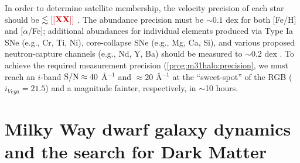 \documentclass[11pt,a4paper,twoside,onecolumn,openany,final,oldfontcommands]{memoir}
\def\NS#1{\noindent{\textcolor{lblue}{\textbf[NS: #1]}}}
\begin{document}
\begin{sciencerequirement}
\reqitem In order to determine satellite membership, the velocity precision of each star should be $\lesssim \edit{XX}$ \kms. 
\reqitem The abundance precision must be $\sim 0.1$ dex for both [Fe/H] and [$\alpha$/Fe]; additional abundances for individual elements produced via Type Ia SNe (e.g., Cr, Ti, Ni), core-collapse SNe (e.g., Mg, Ca, Si), and various proposed neutron-capture channels (e.g., Nd, Y, Ba) should be measured to $\sim$0.2 dex \citep[Fig.~\ref{fig:abundances_snr}; cf.][]{Sandford20}. \NS{This is copied from M31 disk requirements, need to temper for lower metallicity stars}  \label{prog:m31halo:precision}
\reqitem To achieve the required measurement precision (\ref{prog:m31halo:precision}, we must reach an $i$-band ${\rm S/N} \approx 40$ \AA$^{-1}$ and $\approx 20$ \AA$^{-1}$ at the  ``sweet-spot'' of the RGB ($i_{Vega} = 21.5$) and a magnitude fainter, respectively, in $\sim$10 hours. \NS{Spectral Resolution and wavelength requirements?}
\end{sciencerequirement}

\section{Milky Way dwarf galaxy dynamics and the search for Dark Matter}
\end{document}
